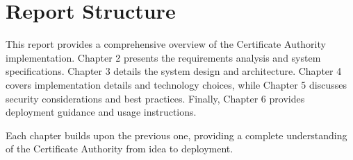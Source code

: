 \section{Report Structure}

This report provides a comprehensive overview of the Certificate Authority implementation. 
Chapter 2 presents the requirements analysis and system specifications. 
Chapter 3 details the system design and architecture. 
Chapter 4 covers implementation details and technology choices, while Chapter 5 discusses security 
considerations and best practices. 
Finally, Chapter 6 provides deployment guidance and usage instructions.

Each chapter builds upon the previous one, providing a complete understanding of the Certificate 
Authority from idea to deployment.
